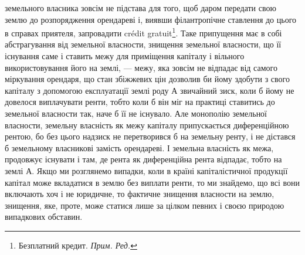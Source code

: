 \parcont{}  %
земельного власника зовсім не підстава для того, щоб даром передати свою землю
до розпорядження орендареві і, виявши філантропічне ставлення до цього в
справах приятеля, запровадити crédit gratuit\footnote*{
Безплатний кредит. \emph{Прим. Ред.}
}. Таке припущення має в собі
абстрагування від земельної власности, знищення земельної власности, що її
існування саме і ставить межу для приміщення капіталу і вільного використовування
його на землі, — межу, яка зовсім не відпадає від самого міркування
орендаря, що стан збіжжевих цін дозволив би йому здобути з свого
капіталу з допомогою експлуатації землі роду $А$ звичайний зиск, коли б йому
не довелося виплачувати ренти, тобто коли б він міг на практиці ставитись до
земельної власности так, наче б її не існувало. Але монополію земельної власности,
земельну власність як межу капіталу припускається диференційною
рентою, бо без цього надзиск не перетворився б на земельну ренту, і не дістався
б земельному власникові замість орендареві. І земельна власність як межа,
продовжує існувати і там, де рента як диференційна рента відпадає, тобто на
землі $А$. Якщо ми розглянемо випадки, коли в країні капіталістичної продукції
капітал може вкладатися в землю без виплати ренти, то ми знайдемо, що всі
вони включають хоч і не юридичне, то фактичне знищення власности на землю,
знищення, яке, проте, може статися лише за цілком певних і своєю природою
випадкових обставин.

